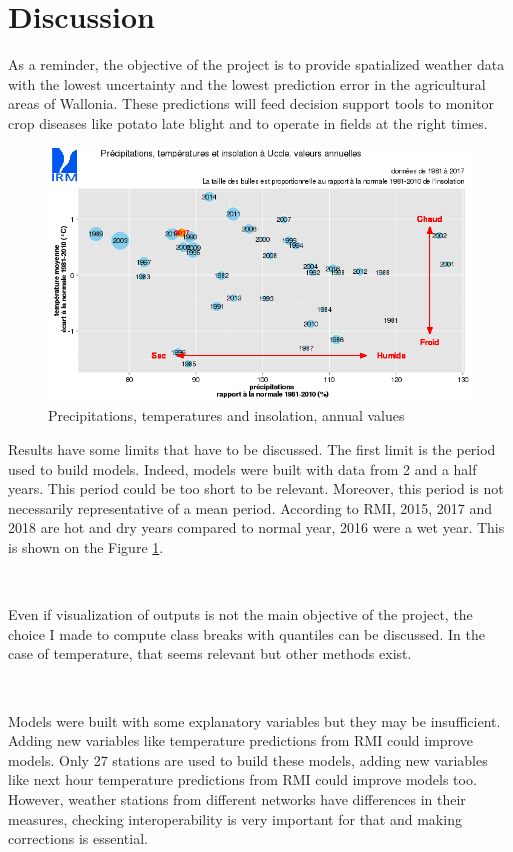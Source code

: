 \documentclass[12pt,twoside]{reedthesis}
\theoremstyle{definition}
\theoremstyle{definition}
\theoremstyle{definition}
\theoremstyle{remark}
\begin{document}
\section{Discussion}\label{discussion}

As a reminder, the objective of the project is to provide spatialized
weather data with the lowest uncertainty and the lowest prediction error
in the agricultural areas of Wallonia. These predictions will feed
decision support tools to monitor crop diseases like potato late blight
and to operate in fields at the right times.
\begin{figure}

{\centering \includegraphics[width=1\linewidth]{figure/rmi_climate_data} 

}

\caption{Precipitations, temperatures and insolation, annual values}\label{fig:rmi}
\end{figure}
Results have some limits that have to be discussed. The first limit is
the period used to build models. Indeed, models were built with data
from 2 and a half years. This period could be too short to be relevant.
Moreover, this period is not necessarily representative of a mean
period. According to RMI, 2015, 2017 and 2018 are hot and dry years
compared to normal year, 2016 were a wet year. This is shown on the
Figure \ref{fig:rmi}.

~

Even if visualization of outputs is not the main objective of the
project, the choice I made to compute class breaks with quantiles can be
discussed. In the case of temperature, that seems relevant but other
methods exist.

~

Models were built with some explanatory variables but they may be
insufficient. Adding new variables like temperature predictions from RMI
could improve models. Only 27 stations are used to build these models,
adding new variables like next hour temperature predictions from RMI
could improve models too. However, weather stations from different
networks have differences in their measures, checking interoperability
is very important for that and making corrections is essential.
\end{document}
